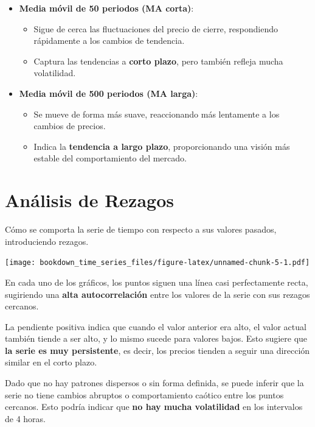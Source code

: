 \documentclass[
]{book}
\begin{document}
\begin{itemize}
\item
  \textbf{Media móvil de 50 periodos (MA corta)}:

  \begin{itemize}
  \item
    Sigue de cerca las fluctuaciones del precio de cierre, respondiendo rápidamente a los cambios de tendencia.
  \item
    Captura las tendencias a \textbf{corto plazo}, pero también refleja mucha volatilidad.
  \end{itemize}
\item
  \textbf{Media móvil de 500 periodos (MA larga)}:

  \begin{itemize}
  \item
    Se mueve de forma más suave, reaccionando más lentamente a los cambios de precios.
  \item
    Indica la \textbf{tendencia a largo plazo}, proporcionando una visión más estable del comportamiento del mercado.
  \end{itemize}
\end{itemize}

\section{Análisis de Rezagos}\label{anuxe1lisis-de-rezagos}

Cómo se comporta la serie de tiempo con respecto a sus valores pasados, introduciendo rezagos.

\texttt{[image: bookdown\_time\_series\_files/figure-latex/unnamed-chunk-5-1.pdf]}

En cada uno de los gráficos, los puntos siguen una línea casi perfectamente recta, sugiriendo una \textbf{alta autocorrelación} entre los valores de la serie con sus rezagos cercanos.

La pendiente positiva indica que cuando el valor anterior era alto, el valor actual también tiende a ser alto, y lo mismo sucede para valores bajos. Esto sugiere que \textbf{la serie es muy persistente}, es decir, los precios tienden a seguir una dirección similar en el corto plazo.

Dado que no hay patrones dispersos o sin forma definida, se puede inferir que la serie no tiene cambios abruptos o comportamiento caótico entre los puntos cercanos. Esto podría indicar que \textbf{no hay mucha volatilidad} en los intervalos de 4 horas.
\end{document}
